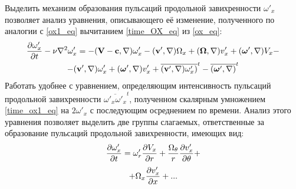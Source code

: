 Выделить механизм образования пульсаций продольной завихренности $\omega'_x$ позволяет анализ уравнения, описывающего её изменение, полученного по аналогии с \eqref{ox1_eq} вычитанием \eqref{time_OX_eq} из \eqref{ox_eq}:
\begin{multline}\label{time_ox1_eq}
\frac{\partial \omega'_x}{\partial t} - \nu \nabla^2 \omega'_x = - (\mathbf{V} - \mathbf{c}, \nabla) \omega'_x - (\mathbf{v}', \nabla) \Omega_x +(\mbox{\boldmath$\Omega$}, \nabla) v'_x + (\mbox{\boldmath$\omega$}', \nabla) V_x - \\ - (\mathbf{v}', \nabla) \omega'_x  + (\mbox{\boldmath$\omega$}', \nabla) v'_x  + \overline{(\mathbf{v}', \nabla) \omega'_x)}^t  - \overline{(\mbox{\boldmath$\omega$}', \nabla)}^t
\end{multline}
Работать удобнее с уравнением, определяющим интенсивность пульсаций продольной завихренности $\overline{\omega'_x \omega'_x}^t$, полученном скалярным умножением \eqref{time_ox1_eq} на $2 \omega'_x$ с последующим осреднением по времени. Анализ этого уравнения позволяет выделить две группы слагаемых, ответственные за образование пульсаций продольной завихренности, имеющих вид:
\begin{equation}\label{time_ox1gen_terms1}
\frac{\partial \omega'_x}{\partial t} = \omega'_r \frac {\partial V_x}{\partial r} + \frac{\Omega_\theta}{r} \frac{\partial v'_x}{\partial \theta} + 
\end{equation}
\begin{equation}\label{time_ox1gen_term2}
+ \Omega_x \frac {\partial v'_x}{\partial x} + ...
\end{equation}
